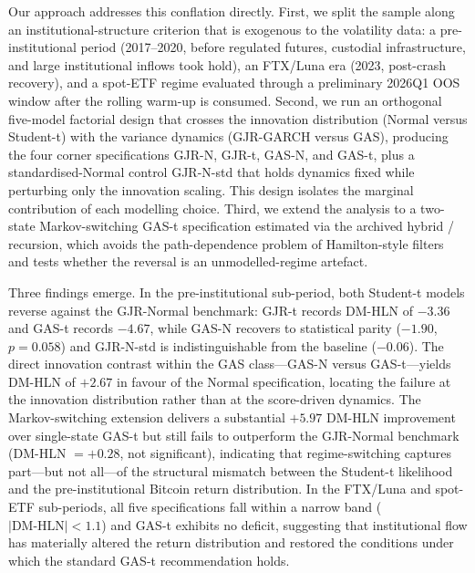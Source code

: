 Our approach addresses this conflation directly. First, we split the sample along an institutional-structure criterion that is exogenous to the volatility data: a pre-institutional period (2017--2020, before regulated futures, custodial infrastructure, and large institutional inflows took hold), an FTX/Luna era (2023, post-crash recovery), and a spot-ETF regime evaluated through a preliminary 2026Q1 OOS window after the rolling warm-up is consumed. Second, we run an orthogonal five-model factorial design that crosses the innovation distribution (Normal versus Student-t) with the variance dynamics (GJR-GARCH versus GAS), producing the four corner specifications GJR-N, GJR-t, GAS-N, and GAS-t, plus a standardised-Normal control GJR-N-std that holds dynamics fixed while perturbing only the innovation scaling. This design isolates the marginal contribution of each modelling choice. Third, we extend the analysis to a two-state Markov-switching GAS-t specification estimated via the archived hybrid \citet{gray1996}/\citet{klaassen2002} recursion, which avoids the path-dependence problem of Hamilton-style filters and tests whether the reversal is an unmodelled-regime artefact.

Three findings emerge. In the pre-institutional sub-period, both Student-t models reverse against the GJR-Normal benchmark: GJR-t records DM-HLN of $-3.36$ and GAS-t records $-4.67$, while GAS-N recovers to statistical parity ($-1.90$, $p = 0.058$) and GJR-N-std is indistinguishable from the baseline ($-0.06$). The direct innovation contrast within the GAS class---GAS-N versus GAS-t---yields DM-HLN of $+2.67$ in favour of the Normal specification, locating the failure at the innovation distribution rather than at the score-driven dynamics. The Markov-switching extension delivers a substantial $+5.97$ DM-HLN improvement over single-state GAS-t but still fails to outperform the GJR-Normal benchmark (DM-HLN $= +0.28$, not significant), indicating that regime-switching captures part---but not all---of the structural mismatch between the Student-t likelihood and the pre-institutional Bitcoin return distribution. In the FTX/Luna and spot-ETF sub-periods, all five specifications fall within a narrow band ($|\text{DM-HLN}| < 1.1$) and GAS-t exhibits no deficit, suggesting that institutional flow has materially altered the return distribution and restored the conditions under which the standard GAS-t recommendation holds.

